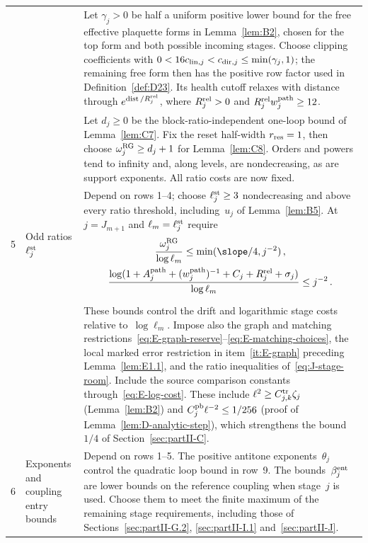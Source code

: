 \begin{longtable}{@{}p{}p{}p{}@{}}
 & & Let $\gamma_j>0$ be half a uniform positive lower bound for the free effective plaquette forms in Lemma~\ref{lem:B2}, chosen for the top form and both possible incoming stages. Choose clipping coefficients with $0<16c_{{\rm lin},j}<c_{{\rm dir},j}\le\min(\gamma_j,1)$; the remaining free form then has the positive row factor used in Definition~\ref{def:D23}. Its health cutoff relaxes with distance through $e^{\operatorname{dist}/R_j^{\rm rel}}$, where $R_j^{\rm rel}>0$ and $R_j^{\rm rel}w_j^{\rm path}\ge12$.\\[3pt]
 & & Let $d_j\ge0$ be the block-ratio-independent one-loop bound of Lemma~\ref{lem:C7}. Fix the reset half-width $r_{\rm res}=1$, then choose $\omega_j^{\rm RG}\ge d_j+1$ for Lemma~\ref{lem:C8}. Orders and powers tend to infinity and, along levels, are nondecreasing, as are support exponents. All ratio costs are now fixed.\\[3pt]
5 & \raggedright Odd ratios $\ell_j^{\rm st}$ & Depend on rows 1--4; choose $\ell_j^{\rm st}\ge3$ nondecreasing and above every ratio threshold, including~$u_j$ of Lemma~\ref{lem:B5}. At $j=J_{m+1}$ and $\ell_m=\ell_j^{\rm st}$ require
\begin{gather*}
\frac{\omega_j^{\rm RG}}{\log\ell_m}\le\min(\slope/4,j^{-2})\,,\\
\frac{\log(1+A_j^{\rm path}+(w_j^{\rm path})^{-1}+C_j+R_j^{\rm rel}+\sigma_j)}{\log\ell_m}\le j^{-2}\,.
\end{gather*}\\[3pt]
 & & These bounds control the drift and logarithmic stage costs relative to~$\log\ell_m$. Impose also the graph and matching restrictions~\eqref{eq:E-graph-reserve}--\eqref{eq:E-matching-choices}, the local marked error restriction in item~\ref{it:E-graph} preceding Lemma~\ref{lem:E1.1}, and the ratio inequalities of~\eqref{eq:J-stage-room}. Include the source comparison constants through~\eqref{eq:E-log-cost}. These include $\ell^2\ge C^{\rm tr}_{j,k}\zeta_j$ (Lemma~\ref{lem:B2}) and $C_j^{\rm pb}\ell^{-2}\le1/256$ (proof of Lemma~\ref{lem:D-analytic-step}), which strengthens the bound $1/4$ of Section~\ref{sec:partII-C}.\\[3pt]
6 & \raggedright Exponents and coupling entry bounds & Depend on rows 1--5. The positive antitone exponents~$\theta_j$ control the quadratic loop bound in row~9. The bounds~$\beta_j^{\rm ent}$ are lower bounds on the reference coupling when stage~$j$ is used. Choose them to meet the finite maximum of the remaining stage requirements, including those of Sections~\ref{sec:partII-G.2}, \ref{sec:partII-I.1} and~\ref{sec:partII-J}.\\[3pt]

\end{longtable}
